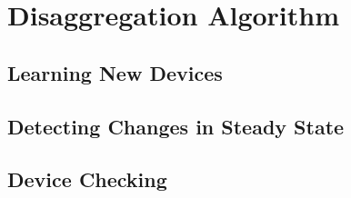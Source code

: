 \section{Disaggregation Algorithm}
\subsection{Learning New Devices}
\subsection{Detecting Changes in Steady State}
\subsection{Device Checking}
